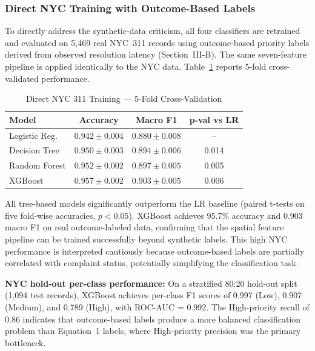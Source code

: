 \documentclass[12pt,onecolumn,draftclsnofoot]{IEEEtran}
\begin{document}
\subsubsection{Direct NYC Training with Outcome-Based Labels}

To directly address the synthetic-data criticism, all four classifiers are retrained and evaluated on 5,469 real NYC~311 records using outcome-based priority labels derived from observed resolution latency (Section~III-B). The same seven-feature pipeline is applied identically to the NYC data. Table~\ref{tab:nyc311_direct} reports 5-fold cross-validated performance.

\begin{table}[h]
\centering
\caption{Direct NYC 311 Training --- 5-Fold Cross-Validation}
\label{tab:nyc311_direct}
\begin{tabular}{lccc}
\toprule
Model & Accuracy & Macro F1 & p-val vs LR \\
\midrule
Logistic Reg. & $0.942 \pm 0.004$ & $0.880 \pm 0.008$ & -- \\
Decision Tree & $0.950 \pm 0.003$ & $0.894 \pm 0.006$ & 0.014 \\
Random Forest & $0.952 \pm 0.002$ & $0.897 \pm 0.005$ & 0.005 \\
XGBoost & $0.957 \pm 0.002$ & $0.903 \pm 0.005$ & 0.006 \\
\bottomrule
\end{tabular}
\end{table}

All tree-based models significantly outperform the LR baseline (paired t-tests on five fold-wise accuracies, $p < 0.05$). XGBoost achieves 95.7\% accuracy and 0.903 macro F1 on real outcome-labeled data, confirming that the spatial feature pipeline can be trained successfully beyond synthetic labels. This high NYC performance is interpreted cautiously because outcome-based labels are partially correlated with complaint status, potentially simplifying the classification task.

\textbf{NYC hold-out per-class performance:} On a stratified 80:20 hold-out split (1,094 test records), XGBoost achieves per-class F1 scores of 0.997 (Low), 0.907 (Medium), and 0.789 (High), with ROC-AUC = 0.992. The High-priority recall of 0.86 indicates that outcome-based labels produce a more balanced classification problem than Equation~1 labels, where High-priority precision was the primary bottleneck.
\end{document}
